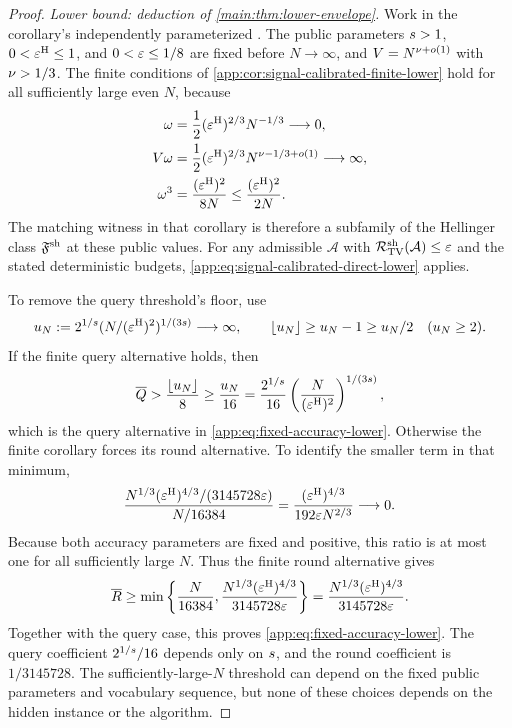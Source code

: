 \begin{proof}
\emph{Lower bound: deduction of \cref{main:thm:lower-envelope}.}
Work in the corollary's independently parameterized \HellingerCase.
The public parameters \(s>1\),
\(0<\varepsilon^{\mathrm H}\le1\), and \(0<\varepsilon\le1/8\) are fixed
before \(N\to\infty\), and
\(V=N^{\nu+o(1)}\) with
\(\nu>1/3\).
The finite conditions of \cref{app:cor:signal-calibrated-finite-lower}
hold for all sufficiently large even \(N\), because
\begin{align*}
 \omega
 &=\frac12(\varepsilon^{\mathrm H})^{2/3}N^{-1/3}\longrightarrow0,\\
 V\omega
 &=\frac12(\varepsilon^{\mathrm H})^{2/3}
      N^{\nu-1/3+o(1)}\longrightarrow\infty,\\
 \omega^3
 &=\frac{(\varepsilon^{\mathrm H})^2}{8N}
 \le\frac{(\varepsilon^{\mathrm H})^2}{2N}.
\end{align*}
The matching witness in that corollary is therefore a subfamily of the
Hellinger class \(\mathfrak F^{\mathrm{sh}}\) at these public values.
For any admissible \(\mathcal A\) with
\(\mathcal R_{\mathrm{TV}}^{\mathrm{sh}}(\mathcal A)\le\varepsilon\) and the stated deterministic
budgets, \eqref{app:eq:signal-calibrated-direct-lower} applies.

To remove the query threshold's floor, use
\[
 u_N:=2^{1/s}
       (N/(\varepsilon^{\mathrm H})^2)^{1/(3s)}
       \longrightarrow\infty,
 \qquad
 \lfloor u_N\rfloor\ge u_N-1\ge u_N/2
 \quad(u_N\ge2).
\]
If the finite query alternative holds, then
\[
 \overline Q>\frac{\lfloor u_N\rfloor}{8}
 \ge\frac{u_N}{16}
 =\frac{2^{1/s}}{16}
       \left(\frac N{(\varepsilon^{\mathrm H})^2}\right)^{1/(3s)},
\]
which is the query alternative in \eqref{app:eq:fixed-accuracy-lower}.
Otherwise the finite corollary forces its round alternative.
To identify the smaller term in that minimum,
\[
 \frac{N^{1/3}(\varepsilon^{\mathrm H})^{4/3}/(3145728\varepsilon)}
      {N/16384}
 =\frac{(\varepsilon^{\mathrm H})^{4/3}}
        {192\varepsilon N^{2/3}}\longrightarrow0.
\]
Because both accuracy parameters are fixed and positive, this ratio is
at most one for all sufficiently large \(N\). Thus the finite round
alternative gives
\[
 \overline R\ge
 \min\left\{\frac N{16384},
   \frac{N^{1/3}(\varepsilon^{\mathrm H})^{4/3}}{3145728\varepsilon}\right\}
 =\frac{N^{1/3}(\varepsilon^{\mathrm H})^{4/3}}{3145728\varepsilon}.
\]
Together with the query case, this proves
\eqref{app:eq:fixed-accuracy-lower}.
The query coefficient \(2^{1/s}/16\) depends only on
\(s\), and the round coefficient is \(1/3145728\).
The sufficiently-large-\(N\) threshold can depend on the fixed public
parameters and vocabulary sequence, but none of these choices depends on
the hidden instance or the algorithm.


\end{proof}
